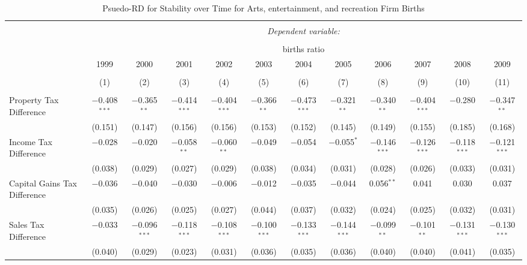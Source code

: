 
\begin{table}[!htbp] \centering 
  \caption{Psuedo-RD for Stability over Time for  Arts, entertainment, and recreation Firm Births} 
  \label{} 
\begin{tabular}{@{\extracolsep{5pt}}lccccccccccc} 
\\[-1.8ex]\hline 
\hline \\[-1.8ex] 
 & \multicolumn{11}{c}{\textit{Dependent variable:}} \\ 
\cline{2-12} 
\\[-1.8ex] & \multicolumn{11}{c}{births ratio} \\ 
 & 1999 & 2000 & 2001 & 2002 & 2003 & 2004 & 2005 & 2006 & 2007 & 2008 & 2009 \\ 
\\[-1.8ex] & (1) & (2) & (3) & (4) & (5) & (6) & (7) & (8) & (9) & (10) & (11)\\ 
\hline \\[-1.8ex] 
 Property Tax Difference & $-$0.408$^{***}$ & $-$0.365$^{**}$ & $-$0.414$^{***}$ & $-$0.404$^{***}$ & $-$0.366$^{**}$ & $-$0.473$^{***}$ & $-$0.321$^{**}$ & $-$0.340$^{**}$ & $-$0.404$^{***}$ & $-$0.280 & $-$0.347$^{**}$ \\ 
  & (0.151) & (0.147) & (0.156) & (0.156) & (0.153) & (0.152) & (0.145) & (0.149) & (0.155) & (0.185) & (0.168) \\ 
  Income Tax Difference & $-$0.028 & $-$0.020 & $-$0.058$^{**}$ & $-$0.060$^{**}$ & $-$0.049 & $-$0.054 & $-$0.055$^{*}$ & $-$0.146$^{***}$ & $-$0.126$^{***}$ & $-$0.118$^{***}$ & $-$0.121$^{***}$ \\ 
  & (0.038) & (0.029) & (0.027) & (0.029) & (0.038) & (0.034) & (0.031) & (0.028) & (0.026) & (0.033) & (0.031) \\ 
  Capital Gains Tax Difference & $-$0.036 & $-$0.040 & $-$0.030 & $-$0.006 & $-$0.012 & $-$0.035 & $-$0.044 & 0.056$^{**}$ & 0.041 & 0.030 & 0.037 \\ 
  & (0.035) & (0.026) & (0.025) & (0.027) & (0.044) & (0.037) & (0.032) & (0.024) & (0.025) & (0.032) & (0.031) \\ 
  Sales Tax Difference & $-$0.033 & $-$0.096$^{***}$ & $-$0.118$^{***}$ & $-$0.108$^{***}$ & $-$0.100$^{***}$ & $-$0.133$^{***}$ & $-$0.144$^{***}$ & $-$0.099$^{**}$ & $-$0.101$^{**}$ & $-$0.131$^{***}$ & $-$0.130$^{***}$ \\ 
  & (0.040) & (0.029) & (0.023) & (0.031) & (0.036) & (0.035) & (0.036) & (0.040) & (0.040) & (0.041) & (0.035) \\ 

\end{tabular}
\end{table}
